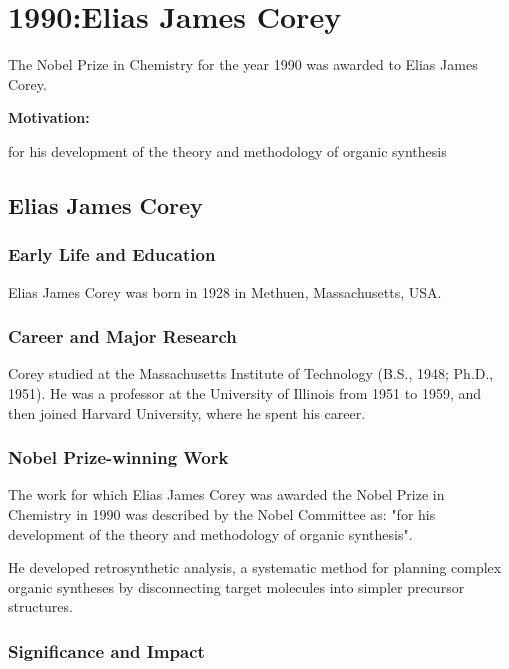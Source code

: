 \chapter{1990:Elias James Corey}

\label{chap:chemistry1990}

The Nobel Prize in Chemistry for the year 1990 was awarded to Elias James Corey.

\textbf{Motivation:}

for his development of the theory and methodology of organic synthesis

\section{Elias James Corey}

\subsection*{Early Life and Education}

Elias James Corey was born in 1928 in Methuen, Massachusetts, USA.

\subsection*{Career and Major Research}

Corey studied at the Massachusetts Institute of Technology (B.S., 1948; Ph.D., 1951). He was a professor at the University of Illinois from 1951 to 1959, and then joined Harvard University, where he spent his career.

\subsection*{Nobel Prize-winning Work}

The work for which Elias James Corey was awarded the Nobel Prize in Chemistry in 1990 was described by the Nobel Committee as: "for his development of the theory and methodology of organic synthesis".

He developed retrosynthetic analysis, a systematic method for planning complex organic syntheses by disconnecting target molecules into simpler precursor structures.

\subsection*{Significance and Impact}


